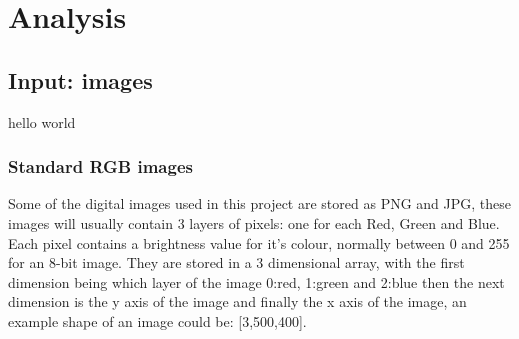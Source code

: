 \section{Analysis}
\begin{comment}
Taking into account the problem and what you learned from the background work, what was your analysis of the problem? How did your analysis help to decompose the problem into the main tasks that you would undertake? Were there alternative approaches? Why did you choose one approach compared to the alternatives? 

There should be a clear statement of the research questions, which you will evaluate at the end of the work. 

In most cases, the agreed objectives or requirements will be the result of a compromise between what would ideally have been produced and what was felt to be possible in the time available. A discussion of the process of arriving at the final list is usually appropriate.
\end{comment}

\subsection{Input: images}
\begin{comment}
Taking into account the problem and what you learned from the background work, what was your analysis of the problem? How did your analysis help to decompose the problem into the main tasks that you would undertake? Were there alternative approaches? Why did you choose one approach compared to the alternatives? 

There should be a clear statement of the research questions, which you will evaluate at the end of the work. 

In most cases, the agreed objectives or requirements will be the result of a compromise between what would ideally have been produced and what was felt to be possible in the time available. A discussion of the process of arriving at the final list is usually appropriate.
\end{comment}

hello world


\subsubsection{Standard RGB images}

Some of the digital images used in this project are stored as PNG and JPG, these images will usually contain 3 layers of pixels: one for each Red, Green and Blue. Each pixel contains a brightness value for it's colour, normally between 0 and 255 for an 8-bit image. They are stored in a 3 dimensional array, with the first dimension being which layer of the image 0:red, 1:green and 2:blue then the next dimension is the y axis of the image and finally the x axis of the image, an example shape of an image could be: [3,500,400].

